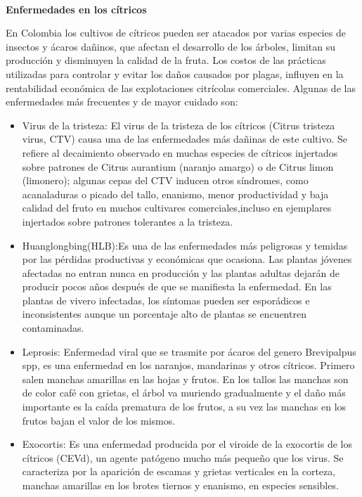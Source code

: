 ~\\\textbf{Enfermedades en los c\'{i}tricos}

En Colombia los cultivos de c\'{i}tricos pueden ser atacados por varias especies de insectos y \'{a}caros da\~{n}inos, que afectan el desarrollo de los \'{a}rboles, limitan su producci\'{o}n y disminuyen la calidad de la fruta. Los costos de las pr\'{a}cticas utilizadas para controlar y evitar los da\~{n}os causados por plagas, influyen en la rentabilidad econ\'{o}mica de las explotaciones citr\'{i}colas comerciales. Algunas de las enfermedades m\'{a}s frecuentes y de mayor cuidado son: 
\begin{itemize}
\item Virus de la tristeza: El virus de la tristeza de los c\'{i}tricos (Citrus tristeza virus, CTV) causa una de las enfermedades m\'{a}s
da\~{n}inas de este cultivo. Se refiere al decaimiento observado en muchas especies de c\'{i}tricos injertados sobre patrones de Citrus aurantium (naranjo amargo) o de Citrus limon (limonero); algunas cepas del CTV inducen otros s\'{i}ndromes, como acanaladuras o picado del tallo, enanismo, menor productividad y baja calidad del fruto en muchos cultivares comerciales,incluso en ejemplares injertados sobre patrones tolerantes a la tristeza.\cite{CTV}
\item Huanglongbing(HLB):Es una de las enfermedades m\'{a}s peligrosas y temidas por las p\'{e}rdidas productivas y econ\'{o}micas que ocasiona. Las plantas j\'{o}venes afectadas no entran nunca en producci\'{o}n y las plantas adultas dejar\'{a}n de producir pocos a\~{n}os despu\'{e}s de que se manifiesta la enfermedad. En las plantas de vivero infectadas, los s\'{i}ntomas pueden ser espor\'{a}dicos e inconsistentes aunque un porcentaje alto de plantas se encuentren contaminadas.\cite{HLB}
\item Leprosis: Enfermedad viral que se trasmite por \'{a}caros del genero Brevipalpus spp, es una enfermedad en los naranjos, mandarinas y otros c\'{i}tricos. Primero salen manchas amarillas en las hojas y frutos. En los tallos las manchas son de color caf\'{e} con grietas, el \'{a}rbol va muriendo gradualmente y el da\~{n}o m\'{a}s importante es la ca\'{i}da prematura de los frutos, a su vez las manchas en los frutos bajan el valor de los mismos.\cite{LEP}
\item Exocortis: Es una enfermedad producida por el viroide de la exocortis de los c\'{i}tricos (CEVd), un agente pat\'{o}geno mucho m\'{a}s peque\~{n}o que los virus. Se caracteriza por la aparici\'{o}n de escamas y grietas verticales en la corteza, manchas amarillas en los brotes tiernos y enanismo, en especies sensibles.\cite{EXO}

\end{itemize}

